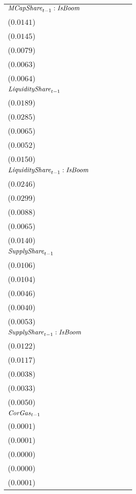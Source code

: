 \begin{tabular}{llllll}
${\it MCapShare}_{t-1}:{\it IsBoom}$      &     \makecell{$-0.0228^{}$ \\ ($0.0141$)} &    \makecell{$-0.0205^{}$ \\ ($0.0145$)} &   \makecell{$0.0279^{***}$ \\ ($0.0079$)} &    \makecell{$0.0142^{**}$ \\ ($0.0063$)} &      \makecell{$0.0042^{}$ \\ ($0.0064$)} \\
${\it LiquidityShare}_{t-1}$              &   \makecell{$0.0771^{***}$ \\ ($0.0189$)} &     \makecell{$0.0436^{}$ \\ ($0.0285$)} &   \makecell{$0.0184^{***}$ \\ ($0.0065$)} &   \makecell{$0.0151^{***}$ \\ ($0.0052$)} &   \makecell{$0.0391^{***}$ \\ ($0.0150$)} \\
${\it LiquidityShare}_{t-1}:{\it IsBoom}$ &      \makecell{$0.0267^{}$ \\ ($0.0246$)} &     \makecell{$0.0456^{}$ \\ ($0.0299$)} &      \makecell{$0.0089^{}$ \\ ($0.0088$)} &      \makecell{$0.0068^{}$ \\ ($0.0065$)} &      \makecell{$0.0132^{}$ \\ ($0.0140$)} \\
${\it SupplyShare}_{t-1}$                 &   \makecell{$0.0399^{***}$ \\ ($0.0106$)} &  \makecell{$0.0448^{***}$ \\ ($0.0104$)} &      \makecell{$0.0073^{}$ \\ ($0.0046$)} &      \makecell{$0.0036^{}$ \\ ($0.0040$)} &   \makecell{$0.0252^{***}$ \\ ($0.0053$)} \\
${\it SupplyShare}_{t-1}:{\it IsBoom}$    &     \makecell{$-0.0017^{}$ \\ ($0.0122$)} &    \makecell{$-0.0117^{}$ \\ ($0.0117$)} &     \makecell{$-0.0006^{}$ \\ ($0.0038$)} &     \makecell{$-0.0001^{}$ \\ ($0.0033$)} &   \makecell{$-0.0118^{**}$ \\ ($0.0050$)} \\
${\it CorGas}_{t-1}$                      &     \makecell{$-0.0000^{}$ \\ ($0.0001$)} &    \makecell{$-0.0001^{}$ \\ ($0.0001$)} &      \makecell{$0.0000^{}$ \\ ($0.0000$)} &     \makecell{$-0.0000^{}$ \\ ($0.0000$)} &     \makecell{$-0.0000^{}$ \\ ($0.0001$)} \\

\end{tabular}
